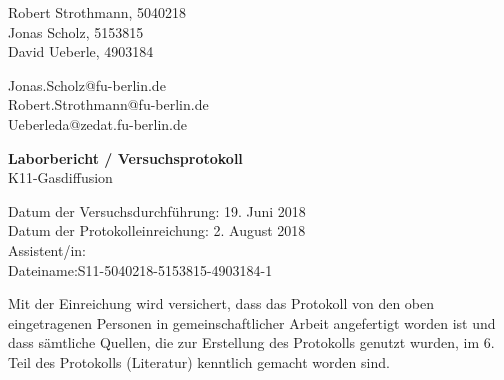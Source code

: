
\thispagestyle{empty}

\begin{flushleft}
Robert Strothmann, 5040218\\ 
Jonas Scholz, 5153815\\ 
David Ueberle, 4903184\\ 
\end{flushleft}
\vspace*{0.3cm}
Jonas.Scholz@fu-berlin.de\\
Robert.Strothmann@fu-berlin.de\\
Ueberleda@zedat.fu-berlin.de\\
\begin{center}
	\vspace*{1cm}
	\Large
	{ \bfseries Laborbericht / Versuchsprotokoll}\\
	\vspace*{1cm}
	{K11-Gasdiffusion}\\
\end{center}
	\vspace*{1cm}
	{Datum der Versuchsdurchführung: 19. Juni 2018}\\
	{Datum der Protokolleinreichung:  2. August 2018}\\
	{Assistent/in: }\\
	{Dateiname:S11-5040218-5153815-4903184-1}	
	\vfill
\begin{flushleft}
Mit der Einreichung wird versichert, dass das Protokoll von den oben eingetragenen Personen in gemeinschaftlicher Arbeit angefertigt worden ist und dass sämtliche Quellen, die zur Erstellung des Protokolls genutzt wurden, im 6. Teil des Protokolls (Literatur) kenntlich gemacht worden sind.
\end{flushleft}

\normalsize
\newpage
%